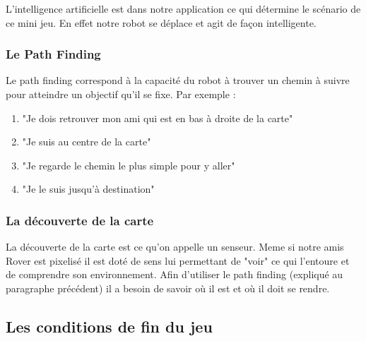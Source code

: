 \documentclass[a4paper 12pts]{article}
\begin{document}
L'intelligence artificielle est dans notre application ce qui détermine le scénario de ce mini jeu.
En effet notre robot se déplace et agit de façon intelligente.
\vspace{0.75cm}

\subsubsection{Le Path Finding}

\vspace{0.75cm}

Le path finding correspond à la capacité du robot à trouver un chemin à suivre pour atteindre un objectif qu'il se fixe.
Par exemple : 

\vspace{0.5cm}

\begin{enumerate}
\item "Je dois retrouver mon ami qui est en bas à droite de la carte"
\item "Je suis au centre de la carte"
\item "Je regarde le chemin le plus simple pour y aller"
\item "Je le suis jusqu'à destination"
\end{enumerate}

\vspace{0.75cm}

\subsubsection{La découverte de la carte}

\vspace{0.75cm}

La découverte de la carte est ce qu'on appelle un senseur.
Meme si notre amis Rover est pixelisé il est doté de sens lui permettant de "voir" ce qui l'entoure et de comprendre son environnement.
Afin d'utiliser le path finding (expliqué au paragraphe précédent) il a besoin de savoir où il est et où il doit se rendre.

\vspace{0.75cm}

\subsection{Les conditions de fin du jeu}

\vspace{0.75cm}
\end{document}
